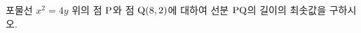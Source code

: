 포물선 $x^2=4y$ 위의 점 $\mathrm{P}$와 점 $\mathrm{Q}(8{,}\mkern3mu\mathopen{}2)$에 대하여 선분 $\mathrm{PQ}$의 길이의 최솟값을 구하시오.
